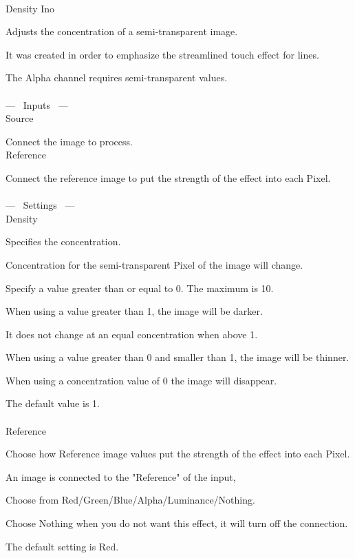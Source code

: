 \documentclass[a4paper,12pt]{article}
\begin{document}
\thispagestyle{empty}

\Large
\noindent \\
Density Ino\medskip
\par
\normalsize
Adjusts the concentration of a semi-transparent image.\par
It was created in order to emphasize the streamlined touch effect for lines.\par
The Alpha channel requires semi-transparent values.\\
\\
--- \ Inputs \ ---\\
Source\par
Connect the image to process.\\
Reference\par
Connect the reference image to put the strength of the effect into each Pixel.\\
\\
--- \ Settings \ ---\\
Density\par
Specifies the concentration.\par
Concentration for the semi-transparent Pixel of the image will change.\par
Specify a value greater than or equal to 0. The maximum is 10.\par
When using a value greater than 1, the image will be darker.\par
It does not change at an equal concentration when above 1.\par
When using a value greater than 0 and smaller than 1, the image will be thinner.\par
When using a concentration value of 0 the image will disappear.\par
The default value is 1.\\
\\
Reference\par
Choose how Reference image values put the strength of the effect into each Pixel.\par
An image is connected to the "Reference" of the input,\par
Choose from Red/Green/Blue/Alpha/Luminance/Nothing.\par
Choose Nothing when you do not want this effect, it will turn off the connection.\par
The default setting is Red.
\end{document}
